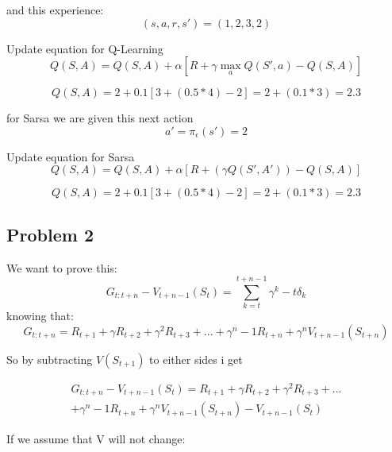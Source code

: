 \documentclass[10pt,a4paper]{article}
\begin{document}
and this experience:
\begin{equation*}
    (s,a,r,s') = (1,2,3,2)
\end{equation*}

Update equation for Q-Learning
\begin{equation*}
    Q(S, A) = Q(S, A) + \alpha [R +\gamma \max_a Q(S', a)- Q(S, A)]
\end{equation*}

\begin{equation*}
    Q(S, A) = 2 + 0.1 [3 + (0.5 * 4) - 2] = 2 + (0.1 * 3) = 2.3
\end{equation*}

for Sarsa we are given this next action
\begin{equation*}
    a' = \pi_\epsilon(s') = 2
\end{equation*}

Update equation for Sarsa 
\begin{equation*}
    Q(S, A) = Q(S, A) + \alpha [R +(\gamma Q(S', A'))- Q(S, A)]
\end{equation*}

\begin{equation*}
    Q(S, A) = 2 + 0.1 [3 + (0.5 *4)- 2] = 2 + (0.1 * 3) = 2.3
\end{equation*}

\newpage
\subsection*{Problem 2}

We want to prove this:
\begin{equation*}
    G_{t:t+n} - V_{t+n-1} (S_t) = \sum_{k = t}^{t+n-1} \gamma^k-t \delta_k  
\end{equation*}
knowing that:
\begin{equation*}
    G_{t:t+n} = R_{t+1} + \gamma R_{t+2} + \gamma^2 R_{t+3} + ... + \gamma^n-1 R_{t+n}+ \gamma^n V_{t+n-1} (S_{t+n}) 
\end{equation*}

So by subtracting $V(S_{t+1})$ to either sides i get

\begin{align*}
    G_{t:t+n} - V_{t+n-1} (S_t) = R_{t+1} + \gamma R_{t+2} + \gamma^2 R_{t+3} + ... \\
    + \gamma^n-1 R_{t+n}+ \gamma^n V_{t+n-1} (S_{t+n}) - V_{t+n-1} (S_t)
\end{align*}

If we assume that V will not change:
\end{document}
